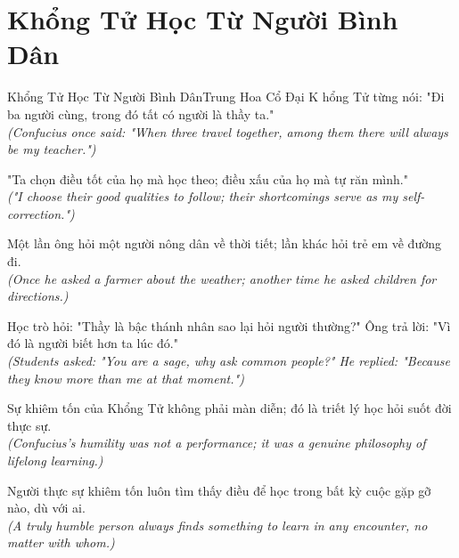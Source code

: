 \section{Khổng Tử Học Từ Người Bình Dân}
\begin{truyen}{Khổng Tử Học Từ Người Bình Dân}{Trung Hoa Cổ Đại}
K hổng Tử từng nói: "Đi ba người cùng, trong đó tất có người là thầy ta."\\
\textit{(Confucius once said: "When three travel together, among them there will always be my teacher.")}

"Ta chọn điều tốt của họ mà học theo; điều xấu của họ mà tự răn mình."\\
\textit{("I choose their good qualities to follow; their shortcomings serve as my self-correction.")}

Một lần ông hỏi một người nông dân về thời tiết; lần khác hỏi trẻ em về đường đi.\\
\textit{(Once he asked a farmer about the weather; another time he asked children for directions.)}

Học trò hỏi: "Thầy là bậc thánh nhân sao lại hỏi người thường?" Ông trả lời: "Vì đó là người biết hơn ta lúc đó."\\
\textit{(Students asked: "You are a sage, why ask common people?" He replied: "Because they know more than me at that moment.")}

Sự khiêm tốn của Khổng Tử không phải màn diễn; đó là triết lý học hỏi suốt đời thực sự.\\
\textit{(Confucius's humility was not a performance; it was a genuine philosophy of lifelong learning.)}

\end{truyen}
\begin{baihoc}
  Người thực sự khiêm tốn luôn tìm thấy điều để học trong bất kỳ cuộc gặp gỡ nào, dù với ai.\\
  \textit{(A truly humble person always finds something to learn in any encounter, no matter with whom.)}
\end{baihoc}

